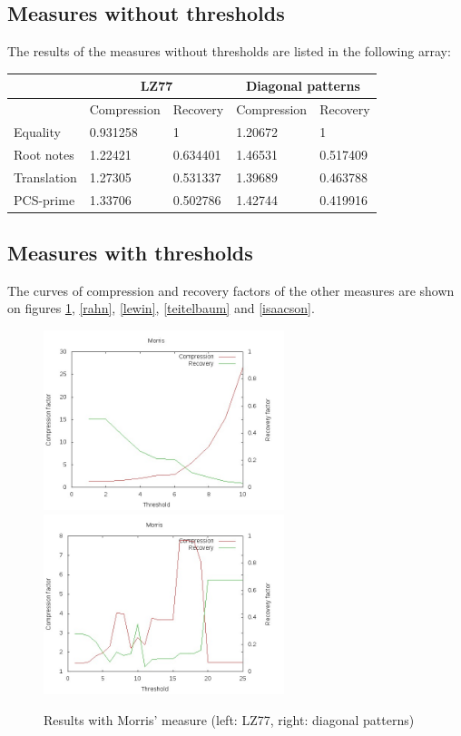 \documentclass[a4paper,10pt]{article}
\begin{document}
\subsection*{Measures without thresholds}

The results of the measures without thresholds are listed in the following array: \\

\begin{tabular}{|l|l|l|l|l|}
\hline
            & \multicolumn{2}{|c|}{\textbf{LZ77}}& \multicolumn{2}{|c|}{\textbf{Diagonal patterns}}\\ \hline
            & Compression & Recovery & Compression       & Recovery \\ \hline
Equality    & 0.931258    & 1        & 1.20672           & 1        \\ \hline
Root notes  & 1.22421     & 0.634401 & 1.46531           & 0.517409 \\ \hline
Translation & 1.27305     & 0.531337 & 1.39689           & 0.463788 \\ \hline
PCS-prime   & 1.33706     & 0.502786 & 1.42744           & 0.419916 \\ \hline
\end{tabular}

\newpage
\subsection*{Measures with thresholds}

The curves of compression and recovery factors of the other measures are shown on figures \ref{morris}, \ref{rahn}, \ref{lewin}, \ref{teitelbaum} and \ref{isaacson}.

\begin{figure}[h!]
\centering
\includegraphics[width=7cm]{images/Morris77.jpg}\hspace{0.5cm}
\includegraphics[width=7cm]{images/MorrisDiag.jpg}
\caption{Results with Morris' measure (left: LZ77, right: diagonal patterns)\label{morris}}
\end{figure}
\end{document}
